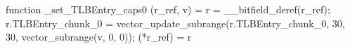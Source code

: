 function _set_TLBEntry_caps0 (r_ref, v) = {
    r = __bitfield_deref(r_ref);
    r.TLBEntry_chunk_0 = vector_update_subrange(r.TLBEntry_chunk_0, 30, 30, vector_subrange(v, 0, 0));
    (*r_ref) = r
}
